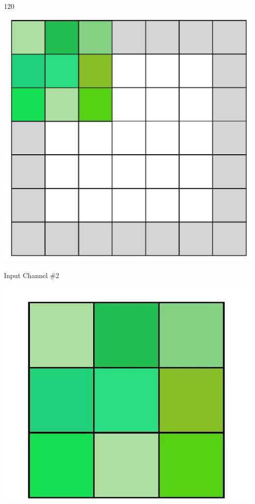 \documentclass[10pt]{article}
\begin{document}
120

\begin{center}
\includegraphics[max width=\textwidth]{2024_01_08_959e2db67a31f073f6d2g-07(7)}
\end{center}

Input Channel \#2

\begin{center}
\includegraphics[max width=\textwidth]{2024_01_08_959e2db67a31f073f6d2g-07(8)}
\end{center}
\end{document}
